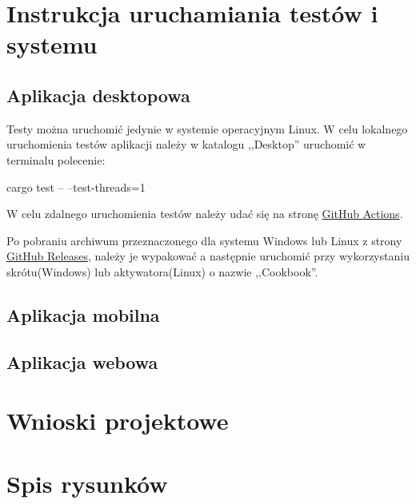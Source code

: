 \documentclass[12pt,a4paper]{article}
\begin{document}
	\section{Instrukcja uruchamiania testów i systemu}
		\subsection{Aplikacja desktopowa}

			\indent Testy można uruchomić jedynie w systemie operacyjnym Linux. W celu lokalnego uruchomienia testów aplikacji należy w katalogu ,,Desktop''
			uruchomić w terminalu polecenie:
			\begin{tcolorbox}[minipage,colback=white,arc=0pt,outer arc=0pt, fontupper=\normalsize]
				\center					
					cargo test -- --test-threads=1
			\end{tcolorbox}

			\indent W celu zdalnego uruchomienia testów należy udać się na stronę \href{https://github.com/MacKarp/Cookbook/actions/workflows/DesktopCI.yml}{GitHub Actions}.
			 
			\indent Po pobraniu archiwum przeznaczonego dla systemu Windows lub Linux z strony \href{https://github.com/MacKarp/Cookbook/releases}{GitHub Releases},
			należy je wypakować a następnie uruchomić przy wykorzystaniu skrótu(Windows) lub aktywatora(Linux) o nazwie ,,Cookbook''. 		
		\subsection{Aplikacja mobilna}
		\subsection{Aplikacja webowa}	 
	
	\newpage

	\section{Wnioski projektowe}
	\newpage

	\newpage	
	\section{Spis rysunków}
		\listoffigures
\end{document}
